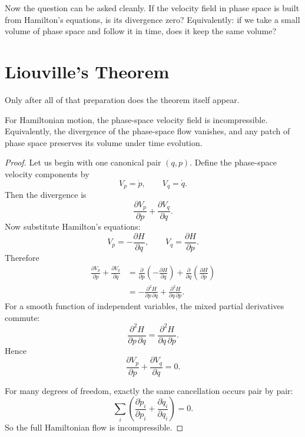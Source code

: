 Now the question can be asked cleanly. If the velocity field in phase space is built from Hamilton's equations, is its divergence zero? Equivalently: if we take a small volume of phase space and follow it in time, does it keep the same volume?

\section{Liouville's Theorem}

Only after all of that preparation does the theorem itself appear.

\begin{theorem}
For Hamiltonian motion, the phase-space velocity field is incompressible. Equivalently, the divergence of the phase-space flow vanishes, and any patch of phase space preserves its volume under time evolution.
\end{theorem}

\begin{proof}
Let us begin with one canonical pair \((q,p)\). Define the phase-space velocity components by
\begin{equation}
V_p=\dot p, \qquad V_q=\dot q.
\end{equation}
Then the divergence is
\begin{equation}
\frac{\partial V_p}{\partial p}+\frac{\partial V_q}{\partial q}.
\end{equation}
Now substitute Hamilton's equations:
\begin{equation}
V_p=-\frac{\partial H}{\partial q}, \qquad V_q=\frac{\partial H}{\partial p}.
\end{equation}
Therefore
\begin{align}
\frac{\partial V_p}{\partial p}+\frac{\partial V_q}{\partial q}
&=
\frac{\partial}{\partial p}\!\left(-\frac{\partial H}{\partial q}\right)
+
\frac{\partial}{\partial q}\!\left(\frac{\partial H}{\partial p}\right) \\
&=
-\frac{\partial^2 H}{\partial p\,\partial q}
+
\frac{\partial^2 H}{\partial q\,\partial p}.
\end{align}
For a smooth function of independent variables, the mixed partial derivatives commute:
\begin{equation}
\frac{\partial^2 H}{\partial p\,\partial q}
=
\frac{\partial^2 H}{\partial q\,\partial p}.
\end{equation}
Hence
\begin{equation}
\frac{\partial V_p}{\partial p}+\frac{\partial V_q}{\partial q}=0.
\end{equation}

For many degrees of freedom, exactly the same cancellation occurs pair by pair:
\begin{equation}
\sum_i\left(
\frac{\partial \dot p_i}{\partial p_i}
+
\frac{\partial \dot q_i}{\partial q_i}
\right)=0.
\end{equation}
So the full Hamiltonian flow is incompressible.
\end{proof}


